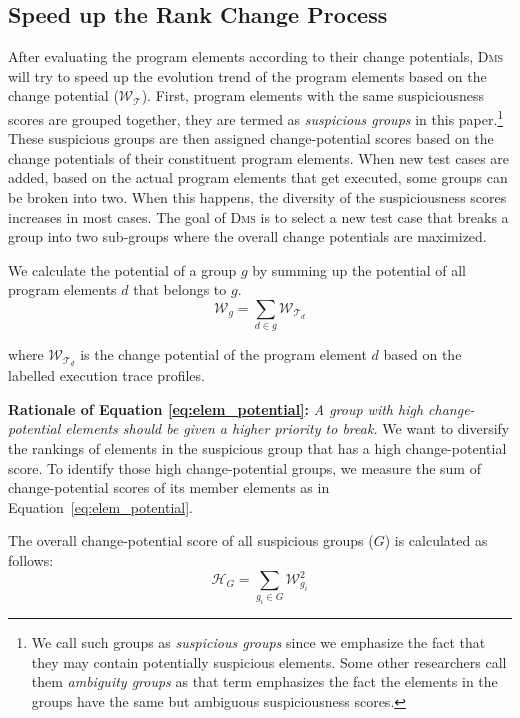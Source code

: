 \subsection{Speed up the Rank Change Process}

After evaluating the program elements according to their change potentials, \textsc{Dms} will try to speed up the evolution trend of the program elements based on the change potential ($\mathcal{W}_{\mathcal{T}}$). First, program elements with the same suspiciousness scores are grouped together, they are termed as {\em suspicious groups} in this paper.\footnote{We call such groups as {\em suspicious groups} since we emphasize the fact that they may contain potentially suspicious elements. Some other researchers \cite[e.g.][]{Alberto2011} call them {\em ambiguity groups} as that term emphasizes the fact the elements in the groups have the same but ambiguous suspiciousness scores.} These suspicious groups are then assigned change-potential scores based on the change potentials of their constituent program elements. When new test cases are added, based on the actual program elements that get executed, some groups can be broken into two. When this happens, the diversity of the suspiciousness scores increases in most cases. The goal of \textsc{Dms} is to select a new test case that breaks a group into two sub-groups where the overall change potentials are maximized.

We calculate the potential of a group $g$ by summing up the potential of all program elements $d$ that
belongs to $g$.
\begin{equation}
\label{eq:elem_potential}
	\mathcal{W}_{g} = \sum\limits_{d \in g}\mathcal{W}_{\mathcal{T}_{d}}
\end{equation}

\noindent
where $\mathcal{W}_{\mathcal{T}_d}$ is the change potential of the program element $d$ based on the labelled execution trace profiles.

\noindent\textbf{Rationale of Equation \ref{eq:elem_potential}:} \textit{A group with high change-potential elements should be given a higher priority to break.}
We want to diversify the rankings of elements in the suspicious group that has a high change-potential score.
To identify those high change-potential groups, we measure the sum of change-potential scores of its member elements as in Equation~\ref{eq:elem_potential}.

The overall change-potential score of all suspicious groups ($G$) is calculated as follows:
\begin{equation}
	\mathcal{H}_G = \sum\limits_{g_{i} \in G}{ \mathcal{W}_{g_i}^{2} }\label{eq:groupset_potential}
\end{equation}


